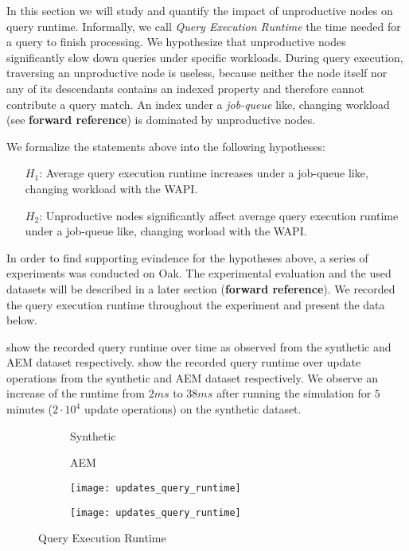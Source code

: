 \documentclass[abstracton,12pt]{scrartcl}
\theoremstyle{definition}
\begin{document}
In this section we will study and quantify the impact of unproductive nodes on
query runtime. Informally, we call \textit{Query Execution Runtime} the time
needed for a query to finish processing. We hypothesize that unproductive nodes
significantly slow down queries under specific workloads. During query
execution, traversing an unproductive node is
useless, because neither the node itself nor any of its descendants contains
an indexed property and therefore cannot contribute a query match.
An index under a \textit{job-queue} like,
changing workload (see \textbf{forward reference}) is dominated by unproductive nodes.

We formalize the statements above into the following hypotheses:

\begin{shaded}
  \begin{itemize}
  \item[$H_1$:] Average query execution runtime increases under a job-queue
    like, changing workload with the WAPI.
  \item[$H_2$:] Unproductive nodes significantly affect average query execution
    runtime under a job-queue like, changing worload with the WAPI.
  \end{itemize}
\end{shaded}

In order to find supporting evindence for the hypotheses above, a series of
experiments was conducted on Oak. The experimental evaluation and the used
datasets will be described in a later section (\textbf{forward reference}). We
recorded  the query execution runtime throughout the experiment and present the data below.

 show the
recorded query runtime over time as observed from the synthetic and AEM dataset respectively. 
 show the
recorded query runtime over update operations from the synthetic and AEM dataset respectively. 
We observe an increase of the runtime from $2 ms$ to $38 ms$
after running the simulation for $5$ minutes ($2 \cdot 10^4$ update operations)
on the synthetic dataset.

\begin{figure}[h]
  \centering
  \begin{subfigure}{0.49\linewidth}
    \centering
    Synthetic
  \end{subfigure}
  \begin{subfigure}{0.49\linewidth}
    \centering
    AEM
  \end{subfigure}
    \begin{subfigure}{0.49\linewidth}
    \centering
    \texttt{[image: updates\_query\_runtime]}
    \caption{}
    \label{fig:query_runtime_synthetic_updates}
  \end{subfigure}
  \begin{subfigure}{0.49\linewidth}
    \centering
    \texttt{[image: updates\_query\_runtime]}
    \caption{}
    \label{fig:query_runtime_aem_updates}
  \end{subfigure}
  \caption{Query Execution Runtime}
  \label{fig:query_runtime}
\end{figure}
\end{document}
